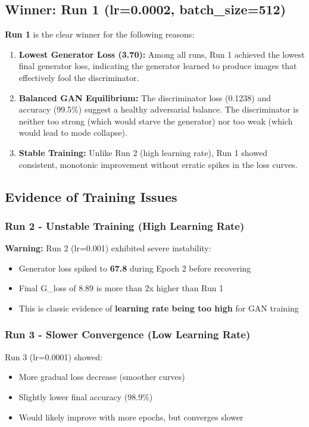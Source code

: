 \documentclass[11pt,a4paper]{article}
\begin{document}
\subsection{Winner: Run 1 (lr=0.0002, batch\_size=512)}

\textbf{Run 1} is the clear winner for the following reasons:

\begin{enumerate}
    \item \textbf{Lowest Generator Loss (3.70):} Among all runs, Run 1 achieved the lowest final generator loss, indicating the generator learned to produce images that effectively fool the discriminator.
    
    \item \textbf{Balanced GAN Equilibrium:} The discriminator loss (0.1238) and accuracy (99.5\%) suggest a healthy adversarial balance. The discriminator is neither too strong (which would starve the generator) nor too weak (which would lead to mode collapse).
    
    \item \textbf{Stable Training:} Unlike Run 2 (high learning rate), Run 1 showed consistent, monotonic improvement without erratic spikes in the loss curves.
\end{enumerate}

\subsection{Evidence of Training Issues}

\subsubsection{Run 2 - Unstable Training (High Learning Rate)}
\textcolor{warningred}{\textbf{Warning:}} Run 2 (lr=0.001) exhibited severe instability:
\begin{itemize}
    \item Generator loss spiked to \textbf{67.8} during Epoch 2 before recovering
    \item Final G\_loss of 8.89 is more than 2x higher than Run 1
    \item This is classic evidence of \textbf{learning rate being too high} for GAN training
\end{itemize}

\subsubsection{Run 3 - Slower Convergence (Low Learning Rate)}
Run 3 (lr=0.0001) showed:
\begin{itemize}
    \item More gradual loss decrease (smoother curves)
    \item Slightly lower final accuracy (98.9\%)
    \item Would likely improve with more epochs, but converges slower
\end{itemize}
\end{document}
